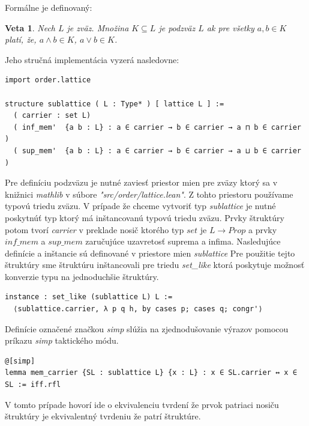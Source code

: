 \documentclass[a4paper,10pt,oneside]{report}%
\newtheorem{theorem}{Veta}[chapter]
\begin{document}
Formálne je definovaný:
\begin{theorem}
    Nech $L$ je zväz. Množina $K \subseteq L$ je \emph{podzväz} $L$ ak pre všetky 
$a,b \in K$ platí, že, $a \wedge b \in K$, $a \vee b \in K$.
\end{theorem}
Jeho stručná implementácia vyzerá nasledovne:
\begin{lstlisting}
import order.lattice

structure sublattice ( L : Type* ) [ lattice L ] :=
  ( carrier : set L)
  ( inf_mem'  {a b : L} : a ∈ carrier → b ∈ carrier → a ⊓ b ∈ carrier )
  ( sup_mem'  {a b : L} : a ∈ carrier → b ∈ carrier → a ⊔ b ∈ carrier )
\end{lstlisting}
    Pre definíciu podzväzu je nutné zaviesť priestor mien pre zväzy ktorý sa v knižnici
\emph{mathlib} v súbore \emph{"src/order/lattice.lean"}.
    Z tohto priestoru používame typovú triedu zväzu.
    V prípade že chceme vytvoriť typ \emph{sublattice} je nutné poskytnúť
typ ktorý má inštancovanú typovú triedu zväzu.
    Prvky štruktúry potom tvorí \emph{carrier} v preklade nosič ktorého typ
$set$ je $L \to Prop$ a prvky $inf\_mem$ a $sup\_mem$ zaručujúce uzavretosť
    suprema a infima.
    Nasledujúce definície a inštancie sú definované v priestore mien \emph{sublattice}
    Pre použitie tejto štruktúry sme štruktúru inštancovali pre triedu \emph{set\_like}
ktorá poskytuje možnosť konverzie typu na jednoduchšie štruktúry.
\begin{lstlisting}
instance : set_like (sublattice L) L :=
  ⟨sublattice.carrier, λ p q h, by cases p; cases q; congr'⟩
\end{lstlisting}
    Definície označené značkou \emph{simp} slúžia na zjednodušovanie výrazov
pomocou príkazu \emph{simp} taktického módu.
\begin{lstlisting}
@[simp]
lemma mem_carrier {SL : sublattice L} {x : L} : x ∈ SL.carrier ↔ x ∈ SL := iff.rfl
\end{lstlisting}
    V tomto prípade hovorí ide o ekvivalenciu tvrdení že prvok patriaci nosiču
štruktúry je ekvivalentný tvrdeniu že patrí štruktúre.
\end{document}
